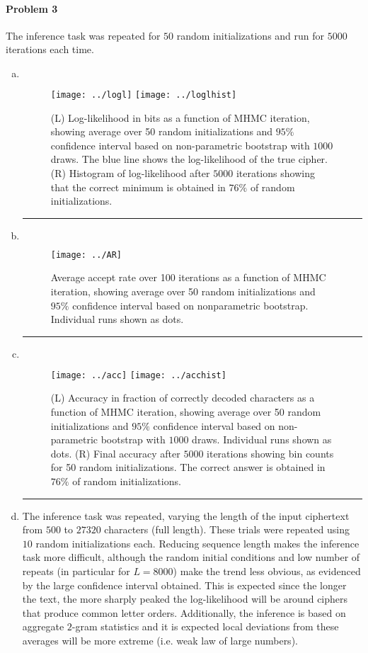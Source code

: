 \documentclass[12pt]{report}
\begin{document}
\paragraph{Problem 3}
$ $ \\
The inference task was repeated for $50$ random initializations and run for $5000$ iterations each time.
\begin{enumerate}[a)]
	\item $ $
	\begin{figure}[H]
		\centering
		\texttt{[image: ../logl]}
		\texttt{[image: ../loglhist]} 
		\caption{ (L) Log-likelihood in bits as a function of MHMC iteration, showing average over 50 random initializations and $95\%$ confidence interval based on non-parametric bootstrap with $1000$ draws. The blue line shows the log-likelihood of the true cipher. (R) Histogram of log-likelihood after $5000$ iterations showing that the correct minimum is obtained in $76\%$ of random initializations. \label{Fig:lolg}}
	\end{figure}
	\hrule 
	\item $ $
	\begin{figure}[H]
	\centering
	\texttt{[image: ../AR]} 
	\caption{Average accept rate over 100 iterations as a function of MHMC iteration, showing average over 50 random initializations and $95\%$ confidence interval based on nonparametric bootstrap. Individual runs shown as dots. \label{Fig:arg}}
	\end{figure}
	\hrule
	\item $ $
	\begin{figure}[H]
	\centering 
	\texttt{[image: ../acc]} 
	\texttt{[image: ../acchist]} 
	\caption{(L) Accuracy in fraction of correctly decoded characters as a function of MHMC iteration, showing average over 50 random initializations and $95\%$ confidence interval based on non-parametric bootstrap with $1000$ draws. Individual runs shown as dots. (R) Final accuracy after $5000$ iterations showing bin counts for 50 random initializations. The correct answer is obtained in $76\%$ of random initializations.  \label{Fig:accg}}
	\end{figure}
	\hrule
	\newpage
	\item The inference task was repeated, varying the length of the input ciphertext from  $500$ to $27320$ characters (full length). These trials were repeated using $10$ random initializations each. Reducing sequence length makes the inference task more difficult, although the random initial conditions and low number of repeats (in particular for $L=8000$) make the trend less obvious, as evidenced by the large confidence interval obtained. This is expected since the  longer the text, the more sharply peaked the log-likelihood will be around ciphers that produce common letter orders. Additionally, the inference is based on aggregate $2$-gram statistics and it is expected local deviations from these averages will be more extreme (i.e. weak law of large numbers).

\end{enumerate}
\end{document}
